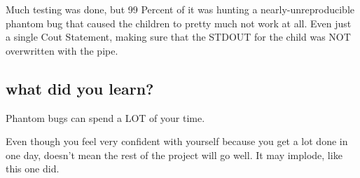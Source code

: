 \documentclass[letterpaper,10pt,titlepage]{article}
\begin{document}
Much testing was done, but 99 Percent of it was hunting a nearly-unreproducible phantom bug that caused the children to pretty much not work at all.  Even just a single Cout Statement, making sure that the STDOUT for the child was NOT overwritten with the pipe.

\subsection{what did you learn?}

Phantom bugs can spend a LOT of your time.

Even though you feel very confident with yourself because you get a lot done in one day, doesn't mean the rest of the project will go well.  It may implode, like this one did.
\end{document}
